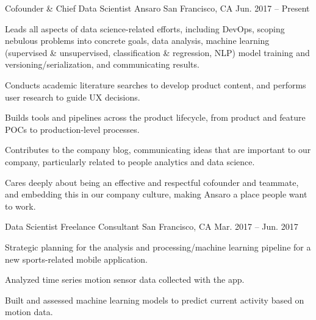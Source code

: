 
\begin{cventries}

  \cventry
    {Cofounder \& Chief Data Scientist} %
    {Ansaro} %
    {San Francisco, CA} %
    {Jun. 2017 -- Present} %
    {
      \begin{cvitems} %
        \item {Leads all aspects of data science-related efforts, including DevOps, scoping nebulous problems into concrete goals, data analysis, machine learning (supervised \& unsupervised, classification \& regression, NLP) model training and versioning/serialization, and communicating results.}
        \item {Conducts academic literature searches to develop product content, and performs user research to guide UX decisions.}
        \item {Builds tools and pipelines across the product lifecycle, from product and feature POCs to production-level processes.}
        \item {Contributes to the company blog, communicating ideas that are important to our company, particularly related to people analytics and data science.}
        \item {Cares deeply about being an effective and respectful cofounder and teammate, and embedding this in our company culture, making Ansaro a place people want to work.}
     \end{cvitems}
    }

  \cventry
    {Data Scientist} %
    {Freelance Consultant} %
    {San Francisco, CA} %
    {Mar. 2017 -- Jun. 2017} %
    {
      \begin{cvitems} %
        \item {Strategic planning for the analysis and processing/machine learning pipeline for a new sports-related mobile application.}
        \item {Analyzed time series motion sensor data collected with the app.}
        \item {Built and assessed machine learning models to predict current activity based on motion data.}
     \end{cvitems}
    }


\end{cventries}
